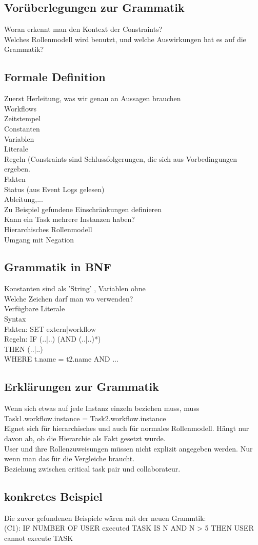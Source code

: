 \subsection{Vorüberlegungen zur Grammatik}
Woran erkennt man den Kontext der Constraints? \\
Welches Rollenmodell wird benutzt, und welche Auswirkungen hat es auf die Grammatik?
\subsection{Formale Definition}
Zuerst Herleitung, was wir genau an Aussagen brauchen\\
Workflows\\
Zeitstempel\\
Constanten\\
Variablen\\
Literale\\
Regeln (Constraints sind Schlussfolgerungen, die sich aus Vorbedingungen ergeben.\\
Fakten\\
Status (aus Event Logs gelesen)\\
Ableitung,...\\
Zu Beispiel gefundene Einschränkungen definieren\\

Kann ein Task mehrere Instanzen haben?\\
Hierarchisches Rollenmodell\\
Umgang mit Negation\\
\subsection{Grammatik in BNF}
Konstanten sind als 'String' , Variablen ohne \\
Welche Zeichen darf man wo verwenden?\\
Verfügbare Literale\\
Syntax\\
Fakten: SET extern|workflow \\
Regeln: 	IF (..|..) (AND (..|..)*) \\
THEN (..|..) \\
WHERE t.name = t2.name AND  ...\\
\subsection{Erklärungen zur Grammatik}
Wenn sich etwas auf jede Instanz einzeln beziehen muss, muss Task1.workflow.instance = Task2.workflow.instance\\
Eignet sich für hierarchisches und auch für normales Rollenmodell. Hängt nur davon ab, ob die Hierarchie als Fakt gesetzt wurde.\\
User und ihre Rollenzuweisungen müssen nicht explizit angegeben werden. Nur wenn man das für die Vergleiche braucht.\\
Beziehung zwischen critical task pair und collaborateur.
\subsection{konkretes Beispiel}
Die zuvor gefundenen Beispiele wären mit der neuen Grammtik:\\
(C1): IF NUMBER OF USER executed TASK IS N AND N > 5 THEN USER cannot execute TASK
